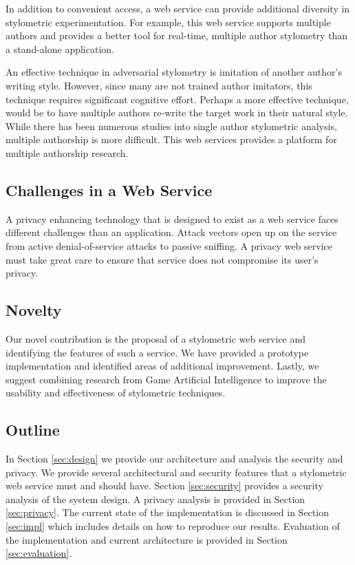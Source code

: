 \documentclass[letterpaper]{article}
\begin{document}
In addition to convenient access, a web service can provide additional
diversity in stylometric experimentation.  For example, this web
service supports multiple authors and provides a better tool for
real-time, multiple author stylometry than a stand-alone application.

An effective technique in adversarial stylometry is imitation of
another author's writing style.  However, since many are not trained
author imitators, this technique requires significant cognitive effort.
Perhaps a more effective technique, would be to have multiple authors
re-write the target work in their natural style.  While there has been
numerous studies into single author stylometric analysis, multiple
authorship is more difficult.  This web services provides a platform
for multiple authorship research.

\subsection{Challenges in a Web Service}

A privacy enhancing technology that is designed to exist as a web
service faces different challenges than an application.  Attack
vectors open up on the service from active denial-of-service attacks
to passive sniffing.  A privacy web service must take great care to
ensure that service does not compromise its user's privacy.

\subsection{Novelty}

Our novel contribution is the proposal of a stylometric web service
and identifying the features of such a service.  We have provided a
prototype implementation and identified areas of additional
improvement.  Lastly, we suggest combining research from Game
Artificial Intelligence to improve the usability and effectiveness of
stylometric techniques.

\subsection{Outline}
In Section \ref{sec:design} we provide our architecture and analysis the
security and privacy.  We provide several architectural and security
features that a stylometric web service must and should have.  Section
\ref{sec:security} provides a security analysis of the system design.
A privacy analysis is provided in Section \ref{sec:privacy}.  The
current state of the implementation is discussed in Section
\ref{sec:impl} which includes details on how to reproduce our
results.  Evaluation of the implementation and current architecture is
provided in Section \ref{sec:evaluation}.
\end{document}
